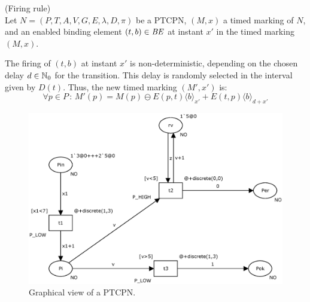 \begin{definition} (Firing rule)\\
Let $N=(P,T,A,V,G,E,\lambda,D,\pi)$ be a PTCPN,
$(M,x)$ a timed marking of $N$, and an enabled
binding element $(t,b) \in {\it BE}$ at 
instant $x'$ in the timed marking $(M,x)$.

The firing of $(t,b)$ at instant $x'$ is non-deterministic,
depending on the chosen delay $d \in \mathbb{N}_{0}$ for the transition.
This delay is randomly selected in the interval given by $D(t)$. 
Thus, the new timed marking $(M',x')$ is: 
%
\[
  \forall p \in P\,:\,
  M'(p) = M(p) \ominus E(p,t)\langle b \rangle_{x'} + E(t,p)\langle b
 \rangle_{d+x'}
\]
%
\end{definition}

\begin{figure}


\hspace*{1.0cm}
\includegraphics[width=11.5cm]{Figures/figure2_scp.eps}
% 
\caption{\label{red1}Graphical view of a PTCPN.}
\end{figure}


